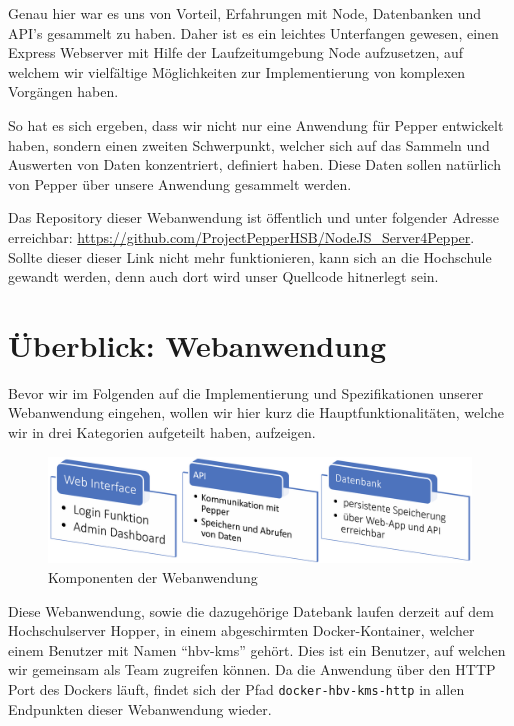 Genau hier war es uns von Vorteil, Erfahrungen mit Node, Datenbanken und API's gesammelt zu haben. Daher ist es ein leichtes Unterfangen gewesen, einen Express Webserver mit Hilfe der Laufzeitumgebung Node aufzusetzen, auf welchem wir vielfältige Möglichkeiten zur Implementierung von komplexen Vorgängen haben.

So hat es sich ergeben, dass wir nicht nur eine Anwendung für Pepper entwickelt haben, sondern einen zweiten Schwerpunkt, welcher sich auf das Sammeln und Auswerten von Daten konzentriert, definiert haben. Diese Daten sollen natürlich von Pepper über unsere Anwendung gesammelt werden.

Das Repository dieser Webanwendung ist öffentlich und unter folgender Adresse erreichbar: \href{https://github.com/ProjectPepperHSB/NodeJS\_Server4Pepper}{https://github.com/ProjectPepperHSB/NodeJS\_Server4Pepper}.
Sollte dieser dieser Link nicht mehr funktionieren, kann sich an die Hochschule gewandt werden, denn auch dort wird unser Quellcode hitnerlegt sein.\\

\section{Überblick: Webanwendung}
\label{sec:nodechapter-ueberblick}
Bevor wir im Folgenden auf die Implementierung und Spezifikationen unserer Webanwendung eingehen, wollen wir hier kurz die Hauptfunktionalitäten, welche wir in drei Kategorien aufgeteilt haben, aufzeigen.

\begin{figure}[H]
    \includegraphics[width=\textwidth]{Figures/NodeChapter/WebAppComponents.png}
    \caption{Komponenten der Webanwendung}
    \label{fig:webappcomponents}
    \centering
\end{figure}

Diese Webanwendung, sowie die dazugehörige Datebank laufen derzeit auf dem Hochschulserver Hopper, in einem abgeschirmten Docker-Kontainer, welcher einem Benutzer mit Namen ``hbv-kms'' gehört. Dies ist ein Benutzer, auf welchen wir gemeinsam als Team zugreifen können. Da die Anwendung über den HTTP Port des Dockers läuft, findet sich der Pfad \verb|docker-hbv-kms-http| in allen Endpunkten dieser Webanwendung wieder.

